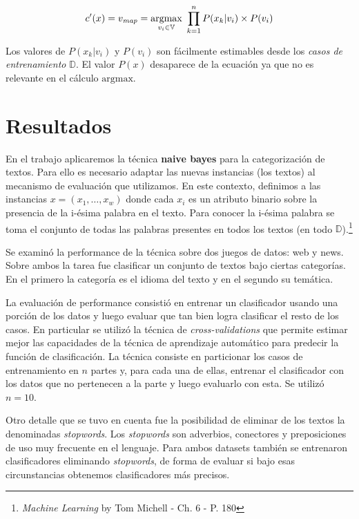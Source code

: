 \documentclass[a4paper,10pt]{article}
\begin{document}
\begin{equation}
  c'(x) = v_{\text{\emph{map}}} = \underset{v_i \in \mathbb{V}}{\text{argmax}}\ \prod^{n}_{k=1} P(x_k | v_i) \times P(v_i)
\end{equation}

Los valores de $P(x_k | v_i)$ y $P(v_i)$ son fácilmente estimables desde los \emph{casos de entrenamiento} $\mathbb{D}$. El valor $P(x)$ desaparece de la ecuación ya que no es relevante en el cálculo $\text{argmax}$.

\section{Resultados}

En el trabajo aplicaremos la técnica \textbf{naive bayes} para la categorización de textos. Para ello es necesario adaptar las nuevas instancias (los textos) al mecanismo de evaluación que utilizamos. En este contexto, definimos a las instancias $x = (x_1, \dots, x_w)$ donde cada $x_i$ es un atributo binario sobre la presencia de la i-ésima palabra en el texto. Para conocer la i-ésima palabra se toma el conjunto de todas las palabras presentes en todos los textos (en todo $\mathbb{D}$).\footnote{\emph{Machine Learning} by Tom Michell - Ch. 6 - P. 180}

Se examinó la performance de la técnica sobre dos juegos de datos: \textsf{web} y \textsf{news}. Sobre ambos la tarea fue clasificar un conjunto de textos bajo ciertas categorías. En el primero la categoría es el idioma del texto y en el segundo su temática. 

La evaluación de performance consistió en entrenar un clasificador usando una porción de los datos y luego evaluar que tan bien logra clasificar el resto de los casos. En particular se utilizó la técnica de \emph{cross-validations} que permite estimar mejor las capacidades de la técnica de aprendizaje automático para predecir la función de clasificación. La técnica consiste en particionar los casos de entrenamiento en $n$ partes y, para cada una de ellas, entrenar el clasificador con los datos que no pertenecen a la parte y luego evaluarlo con esta. Se utilizó $n = 10$.

Otro detalle que se tuvo en cuenta fue la posibilidad de eliminar de los textos la denominadas \emph{stopwords}. Los \emph{stopwords} son adverbios, conectores y preposiciones de uso muy frecuente en el lenguaje. Para ambos datasets también se entrenaron clasificadores eliminando \emph{stopwords}, de forma de evaluar si bajo esas circunstancias obtenemos clasificadores más precisos.
\end{document}
